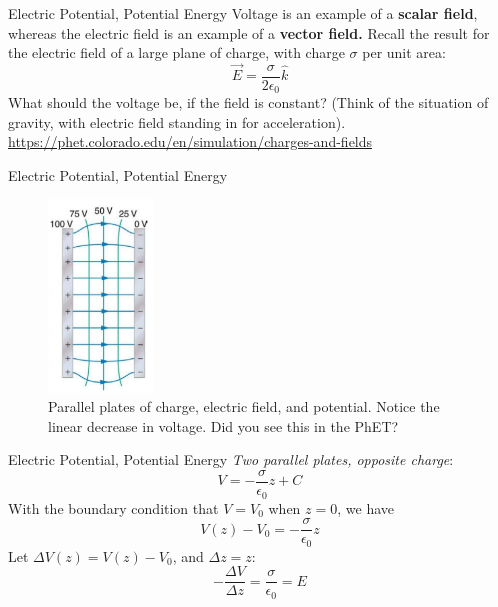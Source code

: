 \documentclass{beamer}
\begin{document}
\begin{frame}{Electric Potential, Potential Energy}
Voltage is an example of a \textbf{scalar field}, whereas the electric field is an example of a \textbf{vector field.}  Recall the result for the electric field of a large plane of charge, with charge $\sigma$ per unit area:
\begin{equation}
\vec{E} = \frac{\sigma}{2\epsilon_0} \hat{k}
\end{equation}
What should the voltage be, if the field is constant?  (Think of the situation of gravity, with electric field standing in for acceleration). \\ \vspace{0.5cm}
\url{https://phet.colorado.edu/en/simulation/charges-and-fields}
\end{frame}

\begin{frame}{Electric Potential, Potential Energy}
\begin{figure}
\centering
\includegraphics[width=0.25\textwidth]{figures/plates.png}
\caption{\label{fig:plates} Parallel plates of charge, electric field, and potential.  Notice the linear decrease in voltage.  Did you see this in the PhET?}
\end{figure}
\end{frame}

\begin{frame}{Electric Potential, Potential Energy}
\textit{Two parallel plates, opposite charge}:
\begin{equation}
V = -\frac{\sigma}{\epsilon_0}z + C
\end{equation}
With the boundary condition that $V = V_0$ when $z = 0$, we have
\begin{equation}
V(z) - V_0 = -\frac{\sigma}{\epsilon_0}z
\end{equation}
Let $\Delta V(z) = V(z) - V_0$, and $\Delta z = z$:
\begin{equation}
-\frac{\Delta V}{\Delta z} = \frac{\sigma}{\epsilon_0} =  E
\end{equation}
\end{frame}
\end{document}
